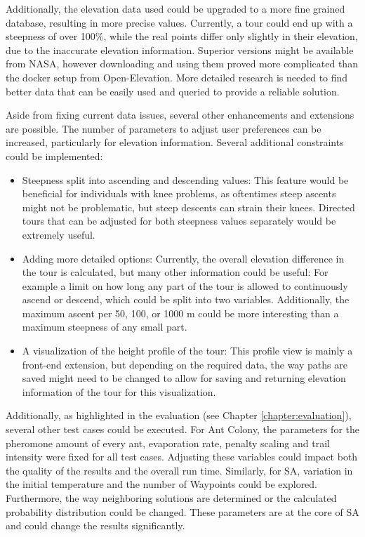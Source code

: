 Additionally, the elevation data used could be upgraded to a more fine grained database, resulting in more precise values. 
Currently, a tour could end up with a steepness of over 100\%, while the real points differ only slightly in their elevation, due to the inaccurate elevation information.
Superior versions might be available from NASA, however downloading and using them proved more complicated than the docker setup from Open-Elevation.
More detailed research is needed to find better data that can be easily used and queried to provide a reliable solution.

Aside from fixing current data issues, several other enhancements and extensions are possible.
The number of parameters to adjust user preferences can be increased, particularly for elevation information.
Several additional constraints could be implemented:
\begin{itemize}
	\item Steepness split into ascending and descending values: This feature would be beneficial for individuals with knee problems, as oftentimes steep ascents might not be problematic, but steep descents can strain their knees. Directed tours that can be adjusted for both steepness values separately would be extremely useful.
	\item Adding more detailed options: Currently, the overall elevation difference in the tour is calculated, but many other information could be useful:
	For example a limit on how long any part of the tour is allowed to continuously ascend or descend, which could be split into two variables.
	Additionally, the maximum ascent per 50, 100, or 1000 m could be more interesting than a maximum steepness of any small part.
	\item A visualization of the height profile of the tour: This profile view is mainly a front-end extension, but depending on the required data, the way paths are saved might need to be changed to allow for saving and returning elevation information of the tour for this visualization.
\end{itemize}

Additionally, as highlighted in the evaluation (see Chapter \ref{chapter:evaluation}), several other test cases could be executed.
For Ant Colony, the parameters for the pheromone amount of every ant, evaporation rate, penalty scaling and trail intensity were fixed for all test cases.
Adjusting these variables could impact both the quality of the results and the overall run time.
Similarly, for SA, variation in the initial temperature and the number of Waypoints could be explored.
Furthermore, the way neighboring solutions are determined or the calculated probability distribution could be changed.
These parameters are at the core of SA and could change the results significantly.

